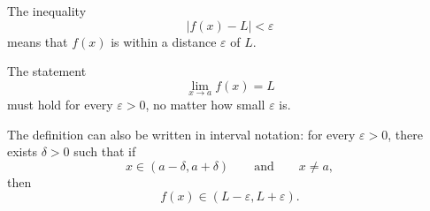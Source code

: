 \begin{remark}
The inequality
\[
|f(x)-L|<\varepsilon
\]
means that \(f(x)\) is within a distance \(\varepsilon\) of \(L\).
\end{remark}

\begin{remark}
The statement
\[
\lim_{x\to a}f(x)=L
\]
must hold for every \(\varepsilon>0\), no matter how small \(\varepsilon\) is.
\end{remark}

\begin{remark}
The definition can also be written in interval notation: for every \(\varepsilon>0\), there exists \(\delta>0\) such that if
\[
x\in (a-\delta,a+\delta)
\qquad \text{and} \qquad x\ne a,
\]
then
\[
f(x)\in (L-\varepsilon,L+\varepsilon).
\]
\end{remark}